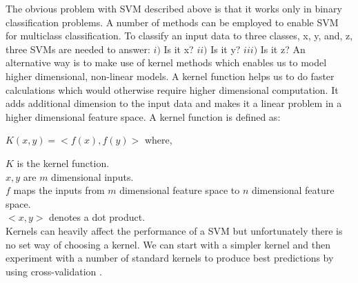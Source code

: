     
The obvious problem with SVM described above is that it works only in binary classification problems. A number of methods can be employed to enable SVM for multiclass classification. To classify an input data to three classes, x, y, and, z, three SVMs are needed to answer: $i)$ Is it x? $ii)$ Is it y? $iii)$ Is it z?\cite{noble2006support}
An alternative way is to make use of kernel methods which enables us to model higher dimensional, non-linear models.
A kernel function helps us to do faster calculations which would otherwise require higher dimensional computation. It adds additional dimension to the input data and makes it a linear problem in a higher dimensional feature space.
A kernel function is defined as:
\begin{center}
  $K (x, y)=<f(x), f(y)>$ where,  
\end{center}
$K$ is the kernel function.\\
$x, y$ are $m$ dimensional inputs.\\
$f$ maps the inputs from $m$ dimensional feature space to $n$ dimensional feature space.\\
$<x, y>$ denotes a dot product.\\
Kernels can heavily affect the performance of a SVM but unfortunately there is no set way of choosing a kernel. We can start with a simpler kernel and then experiment with a number of standard kernels to produce best predictions by using cross-validation \cite{huang2018applications}.



